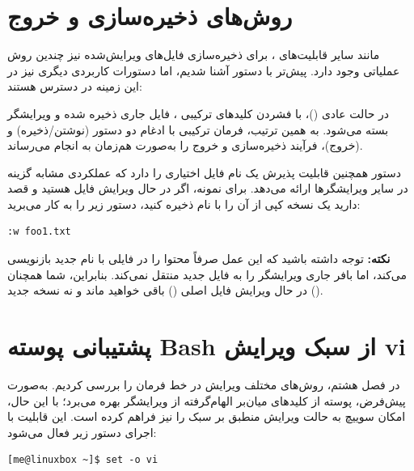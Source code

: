 \section{روش‌های ذخیره‌سازی و خروج}

مانند سایر قابلیت‌های ، برای ذخیره‌سازی فایل‌های ویرایش‌شده نیز چندین روش عملیاتی وجود دارد. پیش‌تر با دستور  آشنا شدیم، اما دستورات کاربردی دیگری نیز در این زمینه در دسترس هستند:

در حالت عادی ()، با فشردن کلیدهای ترکیبی ، فایل جاری ذخیره شده و ویرایشگر بسته می‌شود. به همین ترتیب، فرمان ترکیبی  با ادغام دو دستور  (نوشتن/ذخیره) و  (خروج)، فرآیند ذخیره‌سازی و خروج را به‌صورت هم‌زمان به انجام می‌رساند.

دستور  همچنین قابلیت پذیرش یک نام فایل اختیاری را دارد که عملکردی مشابه گزینه  در سایر ویرایشگرها ارائه می‌دهد. برای نمونه، اگر در حال ویرایش فایل  هستید و قصد دارید یک نسخه کپی از آن را با نام  ذخیره کنید، دستور زیر را به کار می‌برید:

\begin{latin}
\begin{lstlisting}
:w foo1.txt
\end{lstlisting}
\end{latin}

\begin{note}
\textbf{نکته:} توجه داشته باشید که این عمل صرفاً محتوا را در فایلی با نام جدید بازنویسی می‌کند، اما بافر جاری ویرایشگر را به فایل جدید منتقل نمی‌کند. بنابراین، شما همچنان در حال ویرایش فایل اصلی () باقی خواهید ماند و نه نسخه جدید ().
\end{note}

\section{پشتیبانی پوسته Bash از سبک ویرایش vi}

در فصل هشتم، روش‌های مختلف ویرایش در خط فرمان را بررسی کردیم. به‌صورت پیش‌فرض، پوسته  از کلیدهای میان‌بر الهام‌گرفته از ویرایشگر  بهره می‌برد؛ با این حال،  امکان سوییچ به حالت ویرایش منطبق بر سبک  را نیز فراهم کرده است. این قابلیت با اجرای دستور زیر فعال می‌شود:

\begin{latin}
\begin{lstlisting}
[me@linuxbox ~]$ set -o vi
\end{lstlisting}
\end{latin}

